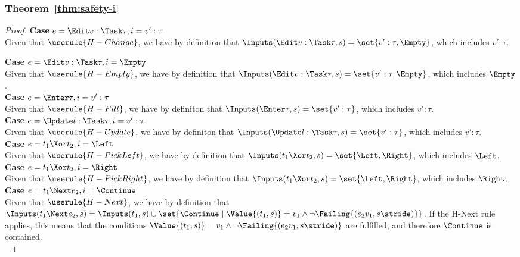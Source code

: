 \subsubsection{Theorem~\ref{thm:safety-i}}
\begin{proof}

  \noindent\textbf{Case} $e=\Edit v:\Task\tau, i= v':\tau$\\
   Given that $\userule{H-Change}$, we have by definition that $\Inputs(\Edit v:\Task\tau,s) = \set{v':\tau,\Empty}$, which includes $v':\tau$.

  \noindent\textbf{Case} $e=\Edit v:\Task\tau, i= \Empty$\\
   Given that $\userule{H-Empty}$, we have by definition that $\Inputs(\Edit v:\Task\tau,s) = \set{v':\tau,\Empty}$, which includes $\Empty$.\\

  \noindent\textbf{Case} $e=\Enter \tau, i= v':\tau$\\
   Given that $\userule{H-Fill}$, we have by definiton that $\Inputs(\Enter \tau,s) = \set{v':\tau }$, which includes $v':\tau$.\\

  \noindent\textbf{Case} $e=\Update l:\Task\tau, i= v':\tau$\\
   Given that $\userule{H-Update}$, we have by definiton that $\Inputs(\Update l:\Task\tau,s)= \set{v':\tau }$, which includes $v':\tau$.\\

  \noindent\textbf{Case} $e=t_1\Xor t_2 , i= \Left$\\
   Given that $\userule{H-PickLeft}$, we have by definition that $\Inputs(t_1\Xor t_2,s) = \set{ \Left,\Right}$, which includes $\Left$.\\

  \noindent\textbf{Case} $e=t_1\Xor t_2 , i= \Right$\\
   Given that $\userule{H-PickRight}$, we have by definition that $\Inputs(t_1\Xor t_2,s) = \set{ \Left,\Right}$, which includes $\Right$.\\

  \noindent\textbf{Case} $e=t_1\Next e_2 , i= \Continue $\\
   Given that $\userule{H-Next}$, we have by definition that $\Inputs(t_1\Next e_2,s) = \Inputs(t_1,s) \cup \set{\Continue\mid \Value{(t_1,s)} = v_1 \wedge \neg\Failing{(e_2 v_1,s\stride)}}$. If the H-Next rule applies, this means that the conditions $\Value{(t_1,s)} = v_1 \wedge \neg\Failing{(e_2 v_1,s\stride)}$ are fulfilled, and therefore $\Continue$ is contained. \\


\end{proof}
